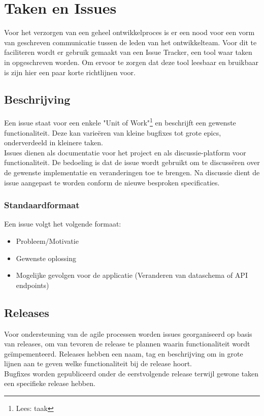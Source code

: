 \chapter{Taken en Issues}

Voor het verzorgen van een geheel ontwikkelproces is er een nood voor een vorm van geschreven communicatie tussen de leden van het ontwikkelteam. Voor dit te faciliteren wordt er gebruik gemaakt van een Issue Tracker, een tool waar taken in opgeschreven worden. Om ervoor te zorgen dat deze tool leesbaar en bruikbaar is zijn hier een paar korte richtlijnen voor.

\section{Beschrijving}

Een issue staat voor een enkele "Unit of Work"\footnote{Lees: taak} en beschrijft een gewenste functionaliteit. Deze kan varie{\"e}ren van kleine bugfixes tot grote epics, onderverdeeld in kleinere taken. \\

Issues dienen als documentatie voor het project en als discussie-platform voor functionaliteit. De bedoeling is dat de issue wordt gebruikt om te discuss{\"e}ren over de gewenste implementatie en veranderingen toe te brengen. Na discussie dient de issue aangepast te worden conform de nieuwe besproken specificaties. 

\subsection{Standaardformaat}

Een issue volgt het volgende formaat:
\begin{itemize}
	\item Probleem/Motivatie
	\item Gewenste oplossing
	\item Mogelijke gevolgen voor de applicatie (Veranderen van dataschema of API endpoints)
\end{itemize}

\section{Releases}

Voor ondersteuning van de agile processen worden issues georganiseerd op basis van releases, om van tevoren de release te plannen waarin functionaliteit wordt ge{\"i}mpementeerd. Releases hebben een naam, tag en beschrijving om in grote lijnen aan te geven welke functionaliteit bij de release hoort. \\
Bugfixes worden gepubliceerd onder de eerstvolgende release terwijl gewone taken een specifieke release hebben.

